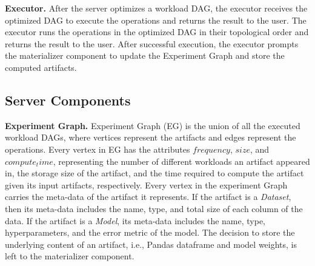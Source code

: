 \textbf{Executor. }
After the server optimizes a workload DAG, the executor receives the optimized DAG to execute the operations and returns the result to the user.
The executor runs the operations in the optimized DAG in their topological order and returns the result to the user.
After successful execution, the executor prompts the materializer component to update the Experiment Graph and store the computed artifacts.

%

\subsection{Server Components}
\textbf{Experiment Graph.}
Experiment Graph (EG) is the union of all the executed workload DAGs, where vertices represent the artifacts and edges represent the operations.
Every vertex in EG has the attributes $frequency$, $size$, and $compute_time$, representing the number of different workloads an artifact appeared in, the storage size of the artifact, and the time required to compute the artifact given its input artifacts, respectively.
Every vertex in the experiment Graph carries the meta-data of the artifact it represents.
If the artifact is a \textit{Dataset}, then its meta-data includes the name, type, and total size of each column of the data.
If the artifact is a \textit{Model}, its meta-data includes the name, type, hyperparameters, and the error metric of the model.
The decision to store the underlying content of an artifact, i.e., Pandas dataframe and model weights, is left to the materializer component.


